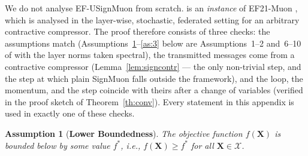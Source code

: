 \documentclass{article}
\newtheorem{assumption}{Assumption}
\begin{document}
We do not analyse EF-USignMuon from scratch.  is an \emph{instance} of EF21-Muon \citep[Algorithm~3]{gruntkowska2025error}, which is analysed in the layer-wise, stochastic, federated setting for an arbitrary contractive compressor. The proof therefore consists of three checks: the assumptions match (Assumptions~\ref{as:1}--\ref{as:3} below are Assumptions~1--2 and~6--10 of \citet{gruntkowska2025error} with the layer norms taken spectral), the transmitted messages come from a contractive compressor (Lemma~\ref{lem:signcontr} --- the only non-trivial step, and the step at which plain SignMuon falls outside the framework), and the loop, the momentum, and the step coincide with theirs after a change of variables (verified in the proof sketch of Theorem~\ref{th:conv}). Every statement in this appendix is used in exactly one of these checks.
\begin{assumption}[\textbf{Lower Boundedness}]\label{as:1}
The objective function $f(\mathbf{X})$ is bounded below by some value $f^*$, i.e., $f(\mathbf{X}) \ge f^*$ for all $\mathbf{X} \in \mathcal{X}$.
\end{assumption}

\end{document}
